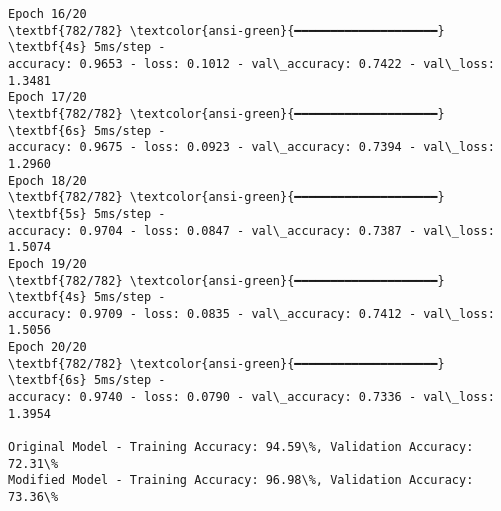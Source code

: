 \documentclass[11pt]{article}
\begin{document}
\begin{Verbatim}[commandchars=\\\{\}]
Epoch 16/20
\textbf{782/782} \textcolor{ansi-green}{━━━━━━━━━━━━━━━━━━━━} \textbf{4s} 5ms/step -
accuracy: 0.9653 - loss: 0.1012 - val\_accuracy: 0.7422 - val\_loss: 1.3481
Epoch 17/20
\textbf{782/782} \textcolor{ansi-green}{━━━━━━━━━━━━━━━━━━━━} \textbf{6s} 5ms/step -
accuracy: 0.9675 - loss: 0.0923 - val\_accuracy: 0.7394 - val\_loss: 1.2960
Epoch 18/20
\textbf{782/782} \textcolor{ansi-green}{━━━━━━━━━━━━━━━━━━━━} \textbf{5s} 5ms/step -
accuracy: 0.9704 - loss: 0.0847 - val\_accuracy: 0.7387 - val\_loss: 1.5074
Epoch 19/20
\textbf{782/782} \textcolor{ansi-green}{━━━━━━━━━━━━━━━━━━━━} \textbf{4s} 5ms/step -
accuracy: 0.9709 - loss: 0.0835 - val\_accuracy: 0.7412 - val\_loss: 1.5056
Epoch 20/20
\textbf{782/782} \textcolor{ansi-green}{━━━━━━━━━━━━━━━━━━━━} \textbf{6s} 5ms/step -
accuracy: 0.9740 - loss: 0.0790 - val\_accuracy: 0.7336 - val\_loss: 1.3954

Original Model - Training Accuracy: 94.59\%, Validation Accuracy: 72.31\%
Modified Model - Training Accuracy: 96.98\%, Validation Accuracy: 73.36\%
    \end{Verbatim}
\end{document}
